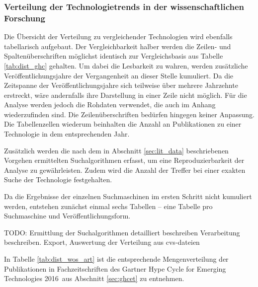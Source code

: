 \subsubsection{Verteilung der Technologietrends in der wissenschaftlichen Forschung}
Die Übersicht der Verteilung zu vergleichender Technologien wird ebenfalls tabellarisch aufgebaut. Der Vergleichbarkeit halber werden die Zeilen- und Spaltenüberschriften möglichst identisch zur Vergleichsbasis aus Tabelle \ref{tab:dist_ghc} gehalten. Um dabei die Lesbarkeit zu wahren, werden zusätzliche Veröffentlichungsjahre der Vergangenheit an dieser Stelle kumuliert. Da die Zeitspanne der Veröffentlichungsjahre sich teilweise über mehrere Jahrzehnte erstreckt, wäre andernfalls ihre Darstellung in einer Zeile nicht möglich. Für die Analyse werden jedoch die Rohdaten verwendet, die auch im Anhang wiederzufinden sind. Die Zeilenüberschriften bedürfen hingegen keiner Anpassung. Die Tabellenzellen wiederum beinhalten die Anzahl an Publikationen zu einer Technologie in dem entsprechenden Jahr.

Zusätzlich werden die nach dem in Abschnitt \ref{sec:lit_data} beschriebenen Vorgehen ermittelten Suchalgorithmen erfasst, um eine Reproduzierbarkeit der Analyse zu gewährleisten. Zudem wird die Anzahl der Treffer bei einer exakten Suche der Technologie festgehalten.

Da die Ergebnisse der einzelnen Suchmaschinen im ersten Schritt nicht kumuliert werden, entstehen zunächst einmal sechs Tabellen -- eine Tabelle pro Suchmaschine und Veröffentlichungsform.

TODO: Ermittlung der Suchalgorithmen detailliert beschreiben
Verarbeitung beschreiben. Export, Auswertung der Verteilung aus cvs-dateien

In Tabelle \ref{tab:dist_wos_art} ist die entsprechende Mengenverteilung der Publikationen in Fachzeitschriften des \glqq Gartner Hype Cycle for Emerging Technologies 2016\grqq~aus Abschnitt \ref{sec:ghcet} zu entnehmen.

